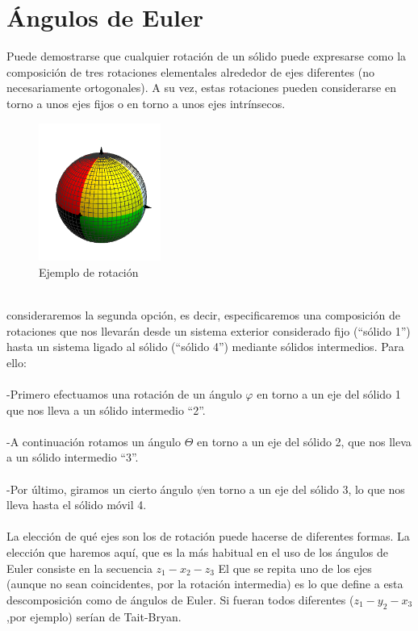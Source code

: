 \documentclass[12pt,a4paper]{report}
\begin{document}
\section{Ángulos de Euler}
Puede demostrarse que cualquier rotación de un sólido puede expresarse como la composición de tres rotaciones elementales alrededor de ejes diferentes (no necesariamente ortogonales). A su vez, estas rotaciones pueden considerarse en torno a unos ejes fijos o en torno a unos ejes intrínsecos.
\begin{figure}[hbtp]
\centering
\includegraphics[width=4cm]{1.png}
\caption{Ejemplo de rotación}
\end{figure}
\noindent\\
consideraremos la segunda opción, es decir, especificaremos una composición de rotaciones que nos llevarán desde un sistema exterior considerado fijo (“sólido 1”) hasta un sistema ligado al sólido (“sólido 4”) mediante sólidos intermedios. Para ello:\\
\noindent\\
-Primero efectuamos una rotación de un ángulo $\varphi$ en torno a un eje del sólido 1 que nos lleva a un sólido intermedio “2”.\\
\noindent\\
-A continuación rotamos un ángulo $\Theta$ en torno a un eje del sólido 2, que nos lleva a un sólido intermedio “3”.\\
\noindent\\
-Por último, giramos un cierto ángulo $\psi$en torno a un eje del sólido 3, lo que nos lleva hasta el sólido móvil 4.\\
\noindent\\
La elección de qué ejes son los de rotación puede hacerse de diferentes formas. La elección que haremos aquí, que es la más habitual en el uso de los ángulos de Euler consiste en la secuencia $z_{1}-x_{2}-z_{3}$ El que se repita uno de los ejes (aunque no sean coincidentes, por la rotación intermedia) es lo que define a esta descomposición como de ángulos de Euler. Si fueran todos diferentes ($z_{1}-y_{2}-x_{3}$,por ejemplo) serían de Tait-Bryan.
\end{document}

